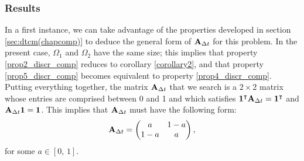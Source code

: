 \subsubsection{Results}
In a first instance, we can take advantage of the properties developed in section \ref{sec:dtcm(chapcomp)} to deduce the general form of $\mathbf A_{\Delta t}$ for this problem. In the present case, $\Omega_1$ and $\Omega_2$ have the same size; this implies that property \ref{prop2_discr_comp} reduces to corollary \ref{corollary2}, and that property \ref{prop5_discr_comp} becomes equivalent to property \ref{prop4_discr_comp}. Putting everything together, the matrix $\mathbf A_{\Delta t}$ that we search is a $2 \times 2$ matrix whose entries are comprised between 0 and 1 and which satisfies $\mathbf 1^\intercal \mathbf A_{\Delta t} = \mathbf 1^\intercal$ and $\mathbf A_{\Delta t} \mathbf 1= \mathbf 1$. This implies that $\mathbf A_{\Delta t}$ must have the following form:
\begin{equation} \label{eq:generalformAdeltat}
	\mathbf A_{\Delta t} = \begin{pmatrix}
		a & 1-a\\ 1-a & a
	\end{pmatrix},
\end{equation}
for some $a \in [0,\,1]$.

